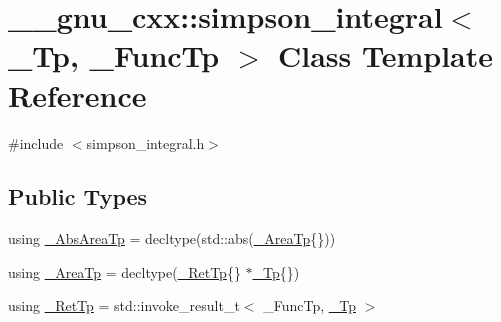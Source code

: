\hypertarget{class____gnu__cxx_1_1simpson__integral}{}\section{\+\_\+\+\_\+gnu\+\_\+cxx\+:\+:simpson\+\_\+integral$<$ \+\_\+\+Tp, \+\_\+\+Func\+Tp $>$ Class Template Reference}
\label{class____gnu__cxx_1_1simpson__integral}


{\ttfamily \#include $<$simpson\+\_\+integral.\+h$>$}

\subsection*{Public Types}
\begin{DoxyCompactItemize}
\item 
using \hyperlink{class____gnu__cxx_1_1simpson__integral_a5c34021e2fac307bd282bf177db9e848}{\+\_\+\+Abs\+Area\+Tp} = decltype(std\+::abs(\hyperlink{class____gnu__cxx_1_1simpson__integral_a4d84c87903e8359f4a617e08703c15a1}{\+\_\+\+Area\+Tp}\{\}))
\item 
using \hyperlink{class____gnu__cxx_1_1simpson__integral_a4d84c87903e8359f4a617e08703c15a1}{\+\_\+\+Area\+Tp} = decltype(\hyperlink{class____gnu__cxx_1_1simpson__integral_a251aaa10ebf0fc261b0ca2f7fc8ed939}{\+\_\+\+Ret\+Tp}\{\} $\ast$\hyperlink{namespace____gnu__cxx_a3b19a9c800ca194374ef9172290f7d79}{\+\_\+\+Tp}\{\})
\item 
using \hyperlink{class____gnu__cxx_1_1simpson__integral_a251aaa10ebf0fc261b0ca2f7fc8ed939}{\+\_\+\+Ret\+Tp} = std\+::invoke\+\_\+result\+\_\+t$<$ \+\_\+\+Func\+Tp, \hyperlink{namespace____gnu__cxx_a3b19a9c800ca194374ef9172290f7d79}{\+\_\+\+Tp} $>$
\end{DoxyCompactItemize}
